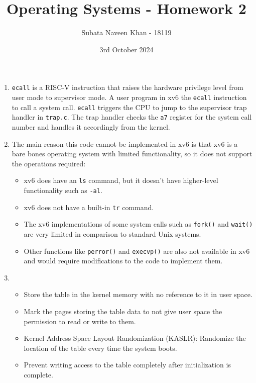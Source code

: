 \documentclass{hw}
\title{Operating Systems - Homework 2}
\author{Subata Naveen Khan - 18119}
\date{3rd October 2024}
\begin{document}
\maketitle

\begin{enumerate}[itemsep=.4cm]
\item %
\texttt{ecall} is a RISC-V instruction that raises the hardware privilege level from user mode to supervisor mode. A user program in xv6 the \texttt{ecall} instruction to call a system call. \texttt{ecall} triggers the CPU to jump to the supervisor trap handler in \texttt{trap.c}. The trap handler checks the \texttt{a7} register for the system call number and handles it accordingly from the kernel.

\item %
The main reason this code cannot be implemented in xv6 is that xv6 is a bare bones operating system with limited functionality, so it does not support the operations required: 
\begin{itemize}
    \item xv6 does have an \texttt{ls} command, but it doesn't have higher-level functionality such as \texttt{-al}.
    \item xv6 does not have a built-in \texttt{tr} command. 
    \item The xv6 implementations of some system calls such as \texttt{fork()} and \texttt{wait()} are very limited in comparison to standard Unix systems. 
    \item Other functions like \texttt{perror()} and \texttt{execvp()} are also not available in xv6 and would require modifications to the code to implement them.
\end{itemize}

\item   %
    \begin{itemize}
    \item Store the table in the kernel memory with no reference to it in user space.
    \item Mark the pages storing the table data to not give user space the permission to read or write to them.
    \item Kernel Address Space Layout Randomization (KASLR): Randomize the location of the table every time the system boots.
    \item Prevent writing access to the table completely after initialization is complete. 
    \end{itemize}


\end{enumerate}
\end{document}
